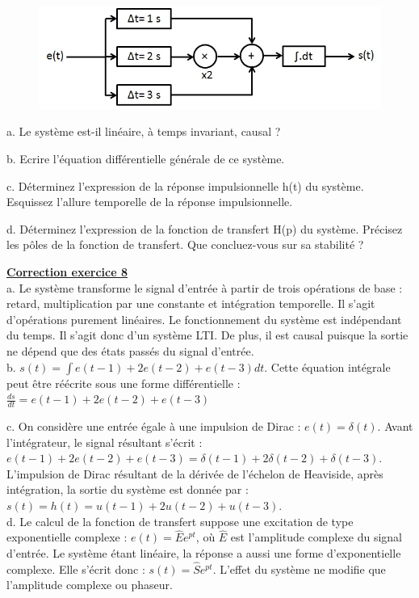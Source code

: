 \documentclass[11pt]{report}
\begin{document}
 	\begin{figure}[h!]
 		\centering
 		\includegraphics[scale=0.5]{images/Exo_2_6.jpg} 
 	\end{figure}
 
 	a. Le système est-il linéaire, à temps invariant, causal ?
 	
 	b. Ecrire l'équation différentielle générale de ce système.
 	
 	c. Déterminez l'expression de la réponse impulsionnelle h(t) du système. Esquissez l'allure temporelle de la réponse impulsionnelle. 
 	
 	d. Déterminez l'expression de la fonction de transfert H(p) du système. Précisez les pôles de la fonction de transfert. Que concluez-vous sur sa stabilité ?
 
 	\vspace{1\baselineskip}
 	
 		\textbf{\underline{Correction exercice 8}}\\
 	a. Le système transforme le signal d'entrée à partir de trois opérations de base : retard, multiplication par une constante et intégration temporelle. Il s'agit d'opérations purement linéaires. Le fonctionnement du système est indépendant du temps. Il s'agit donc d'un système LTI. De plus, il est causal puisque la sortie ne dépend que des états passés du signal d'entrée.\\
 	
 	b. $s(t)=\int e(t-1)+2e(t-2)+e(t-3) dt$. Cette équation intégrale peut être réécrite sous une forme différentielle : $\frac{ds}{dt}=e(t-1)+2e(t-2)+e(t-3)$ 
 	
 	c. On considère une entrée égale à une impulsion de Dirac : $e(t) = \delta(t)$.	Avant l'intégrateur, le signal résultant s'écrit : $e(t-1)+2e(t-2)+e(t-3)=\delta(t-1)+2\delta(t-2)+\delta(t-3)$. L'impulsion de Dirac résultant de la dérivée de l'échelon de Heaviside, après intégration, la sortie du système est donnée par : $s(t) = h(t) = u(t-1)+2u(t-2)+u(t-3)$.\\
 	
 	d. Le calcul de la fonction de transfert suppose une excitation de type exponentielle complexe : $e(t)=\hat{E}e^{pt}$, où $\hat{E}$ est l'amplitude complexe du signal d'entrée. Le système étant linéaire, la réponse a aussi une forme d'exponentielle complexe. Elle s'écrit donc : $s(t)=\hat{S}e^{pt}$. L'effet du système ne modifie que l'amplitude complexe ou phaseur.
 	
\end{document}
